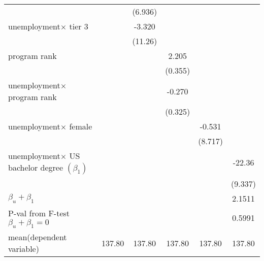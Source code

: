 \begin{table}[htbp]
\begin{adjustbox}{max width=0.6\textwidth}
\begin{tabular}{l*{5}{c}}
            &                     &     (6.936)         &                     &                     &                     \\
[1em]
unemployment$\times$ tier 3 &                     &      -3.320         &                     &                     &                     \\
            &                     &     (11.26)         &                     &                     &                     \\
[1em]
program rank       &                     &                     &       2.205\sym{***}&                     &                     \\
            &                     &                     &     (0.355)         &                     &                     \\
[1em]
unemployment$\times$ program rank &                     &                     &      -0.270         &                     &                     \\
            &                     &                     &     (0.325)         &                     &                     \\
[1em]
unemployment$\times$ female &                     &                     &                     &      -0.531         &                     \\
            &                     &                     &                     &     (8.717)         &                     \\
[1em]
unemployment$\times$ US bachelor degree $\left( \beta_1 \right)$&                     &                     &                     &                     &      -22.36\sym{**} \\
            &                     &                     &                     &                     &     (9.337)         \\
\hline
$\beta_u + \beta_1 $ &                 &                 &                 &              &   2.1511  \\
P-val from F-test $\beta_u + \beta_1=0 $&                 &                 &                 &              &  0.5991  \\
\hline
mean(dependent variable)        &     137.80         &    137.80        &   137.80          &   137.80     &  137.80    \\

\end{tabular}
\end{adjustbox}
\end{table}
